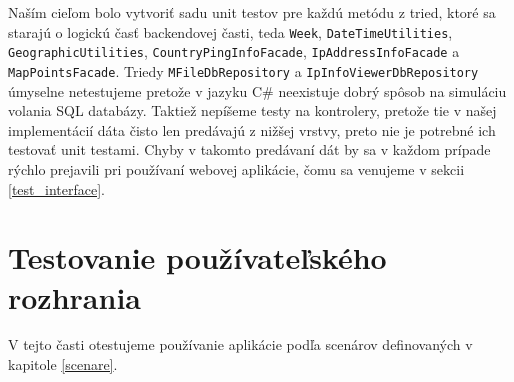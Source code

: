 Naším cieľom bolo vytvoriť sadu unit testov pre každú metódu z tried, ktoré sa starajú o logickú časť backendovej časti, teda \lstinline{Week}, 
\lstinline{DateTimeUtilities}, \lstinline{GeographicUtilities}, \lstinline{CountryPingInfoFacade}, \lstinline{IpAddressInfoFacade} a \lstinline{MapPointsFacade}.
Triedy \lstinline{MFileDbRepository} a \lstinline{IpInfoViewerDbRepository} úmyselne netestujeme pretože v jazyku C\# neexistuje dobrý spôsob na simuláciu 
volania SQL databázy. Taktiež nepíšeme testy na kontrolery, pretože tie v našej implementácií dáta čisto len predávajú z nižšej vrstvy, preto nie je potrebné 
ich testovať unit testami. Chyby v takomto predávaní dát by sa v každom prípade rýchlo prejavili pri používaní webovej aplikácie, čomu sa venujeme v sekcii 
\ref{test_interface}.

\section{Testovanie používateľského rozhrania}
V tejto časti otestujeme používanie aplikácie podľa scenárov definovaných v kapitole \ref{scenare}.
\label{test_interface}